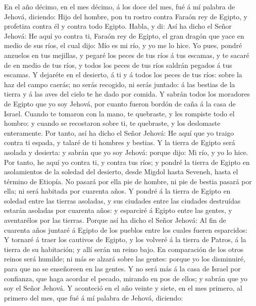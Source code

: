  En el año décimo, en el mes décimo, á los doce del mes, fué
á mí palabra de Jehová, diciendo:  Hijo del hombre, pon tu
rostro contra Faraón rey de Egipto, y profetiza contra él y contra todo
Egipto.  Habla, y di: Así ha dicho el Señor Jehová: He aquí
yo contra ti, Faraón rey de Egipto, el gran dragón que yace en medio de
sus ríos, el cual dijo: Mío es mi río, y yo me lo hice.  Yo
pues, pondré anzuelos en tus mejillas, y pegaré los peces de tus ríos á
tus escamas, y te sacaré de en medio de tus ríos, y todos los peces de
tus ríos saldrán pegados á tus escamas.  Y dejaréte en el
desierto, á ti y á todos los peces de tus ríos: sobre la haz del campo
caerás; no serás recogido, ni serás juntado: á las bestias de la tierra
y á las aves del cielo te he dado por comida.  Y sabrán
todos los moradores de Egipto que yo soy Jehová, por cuanto fueron
bordón de caña á la casa de Israel.  Cuando te tomaron con
la mano, te quebraste, y les rompiste todo el hombro: y cuando se
recostaron sobre ti, te quebraste, y los deslomaste enteramente.
 Por tanto, así ha dicho el Señor Jehová: He aquí que yo
traigo contra ti espada, y talaré de ti hombres y bestias. 
Y la tierra de Egipto será asolada y desierta: y sabrán que yo soy
Jehová: porque dijo: Mi río, y yo lo hice.  Por tanto, he
aquí yo contra ti, y contra tus ríos; y pondré la tierra de Egipto en
asolamientos de la soledad del desierto, desde Migdol hasta Seveneh,
hasta el término de Etiopía.  No pasará por ella pie de
hombre, ni pie de bestia pasará por ella; ni será habitada por cuarenta
años.  Y pondré á la tierra de Egipto en soledad entre las
tierras asoladas, y sus ciudades entre las ciudades destruídas estarán
asoladas por cuarenta años: y esparciré á Egipto entre las gentes, y
aventarélos por las tierras.  Porque así ha dicho el Señor
Jehová: Al fin de cuarenta años juntaré á Egipto de los pueblos entre
los cuales fueren esparcidos:  Y tornaré á traer los
cautivos de Egipto, y los volveré á la tierra de Patros, á la tierra de
su habitación; y allí serán un reino bajo.  En comparación
de los otros reinos será humilde; ni más se alzará sobre las gentes:
porque yo los disminuiré, para que no se enseñoreen en las gentes.
 Y no será más á la casa de Israel por confianza, que haga
acordar el pecado, mirando en pos de ellos; y sabrán que yo soy el Señor
Jehová.  Y aconteció en el año veinte y siete, en el mes
primero, al primero del mes, que fué á mí palabra de Jehová, diciendo:
